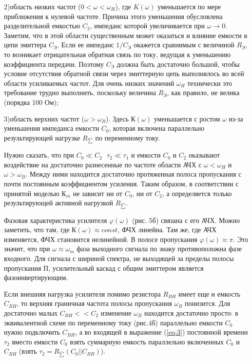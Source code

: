 2)область низких частот ($0 <\omega<\omega_H$), где $K(\omega)$ уменьшается по мере приближения к нулевой частоте. Причина этого уменьшения обусловлена разделительной емкостью $C_2$, импеданс которой увеличивается при $\omega \rightarrow 0$. Заметим, что в этой области существенным может оказаться и влияние емкости в цепи эмиттера $C_{\text{Э}}$. Если ее импеданс $1/C_{\text{Э}}$ окажется сравнимым с величиной $R_{\text{Э}}$, то возникает отрицательная обратная связь по току, ведущая к уменьшению коэффициента передачи. Поэтому $C_{\text{Э}}$ должна быть достаточно большой, чтобы условие отсутствия обратной связи через эмиттерную цепь выполнялось во всей области усиливаемых частот. Для очень низких значений $\omega_H$ технически это требование трудно выполнить, поскольку величина $R_{\text{Э}}$, как правило, не велика (порядка 100 Ом);

3)область верхних частот ($\omega > \omega_B$). Здесь $К(\omega)$ уменьшается с ростом $\omega$ из-за уменьшения импеданса емкости $C_0$, которая включена параллельно результирующей нагрузке $R_{\sum}$ по переменному току.

Нужно сказать, что при $C_0\ll C_2~~~\tau_2 \ll \tau_1$ и емкости $C_0$ и $C_2$ оказывают воздействие на достаточно разнесенные по частоте области АЧХ с $\omega<\omega_H$ и $\omega>\omega_B$. Между ними находится достаточно протяженная полоса пропускания с почти постоянным коэффициентом усиления. Таким образом, в соответствии с принятой моделью $К_m$ не зависит ни от $C_0$, ни от $C_2$, а определяется только результирующей активной нагрузкой $R_{\sum}$. 

Фазовая характеристика усилителя $\varphi(\omega)$ (рис. 5б) связана с его АЧХ. Можно заметить, что там, где $К(\omega) \approx const$, ФЧХ линейна. Там же, где АЧХ изменяется, ФЧХ становится нелинейной. В полосе пропускания $\varphi(\omega) \approx \pi$. Это значит, что при $\omega \approx \omega_m$ фаза выходного сигнала по знаку противоположна фазе входного. Для сигнала с шириной спектра, не выходящей за пределы полосы пропускания П, усилительный каскад с общим эмиттером является фазоинвертирующим.

Если внешняя нагрузка усилителя помимо резистора $R_{BH}$ имеет еще и емкость $C_{BH}$, то верхняя граничная частота полосы пропускания $\omega_B$ понизится. Для достаточно малых $C_{BH}<<C_2$ изменение $\omega_B$ находится достаточно просто: в эквивалентной схеме по переменному току (рис.4б) параллельно емкости $C_0$ нужно подключить $C_{BH}$, а во входящей в выражение (\ref{eq:3}) постоянной времени $\tau_2$ вместо емкости $C_0$ взять суммарную емкость параллельно включенных $C_0$ и $C_{BH}$ (взять $\tau_2 = R_{\sum}(C_0||C_{BH})$).

